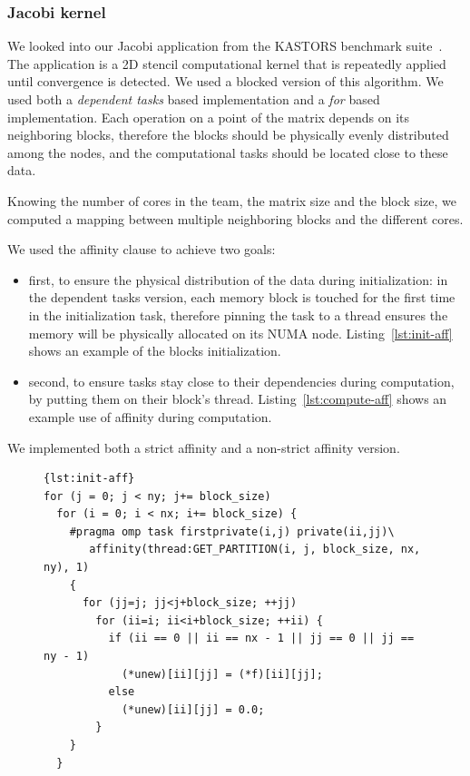 \documentclass{Styles/llncs}
\begin{document}
\subsubsection{Jacobi kernel}

We looked into our Jacobi application from the KASTORS benchmark suite~\cite{virouleau:hal-01081974}.
The application is a 2D stencil computational kernel that is repeatedly applied until
convergence is detected. We used a blocked version of this algorithm.
We used both a \emph{dependent tasks} based implementation and a \emph{for} based implementation.
Each operation on a point of the matrix depends on its neighboring blocks,
therefore the blocks should be physically evenly distributed among the nodes,
and the computational tasks should be located close to these data.

Knowing the number of cores in the team, the matrix size and the block size, we computed a mapping
between multiple neighboring blocks and the different cores.

We used the affinity clause to achieve two goals:
\begin{itemize}
    \item first, to ensure the physical distribution of the data during initialization:
      in the dependent tasks version, each memory block is touched for the first time
      in the initialization task, therefore pinning the task to a thread ensures
      the memory will be physically allocated on its NUMA node.
      Listing~\ref{lst:init-aff} shows an example of the blocks initialization.
    \item second, to ensure tasks stay close to their dependencies during computation, by putting them on their block's thread.
      Listing~\ref{lst:compute-aff} shows an example use of affinity during computation.
\end{itemize}


We implemented both a strict affinity and a non-strict affinity version.


\begin{figure}[htbp]
\begin{lstlisting}[caption=Example of use of the affinity clause for initialization,frame=tlrb,style=smaller,label=lst:init-aff]{lst:init-aff}
for (j = 0; j < ny; j+= block_size)
  for (i = 0; i < nx; i+= block_size) {
    #pragma omp task firstprivate(i,j) private(ii,jj)\
       affinity(thread:GET_PARTITION(i, j, block_size, nx, ny), 1)
    {
      for (jj=j; jj<j+block_size; ++jj)
        for (ii=i; ii<i+block_size; ++ii) {
          if (ii == 0 || ii == nx - 1 || jj == 0 || jj == ny - 1)
            (*unew)[ii][jj] = (*f)[ii][jj];
          else
            (*unew)[ii][jj] = 0.0;
        }
    }
  }
\end{lstlisting}
\end{figure}
\end{document}
